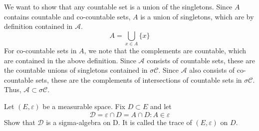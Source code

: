 \begin{solution}
	We want to show that any countable set is a union of the singletons. Since $A$ contains countable and co-countable sets, $A$ is a union of singletons, which are by definition contained in $\mathcal{A}$.
	\begin{equation}
		A = \bigcup_{x\in A}\{x\}
	\end{equation}
	For co-countable sets in $A$, we note that the complements are countable, which are contained in the above definition. Since $\mathcal{A}$ consists of countable sets, these are the countable unions of singletons contained in $\sigma \mathcal{C}$. Since $\mathcal{A}$ also consists of co-countable sets, these are the complements of intersections of countable sets in $\sigma \mathcal{C}$. Thus, $\mathcal{A} \subset \sigma \mathcal{C}$.
\end{solution}

\fullpageboxline
\begin{problem}
	Let $(E, \varepsilon)$ be a measurable space. Fix $D\subset E$ and let $$\mathcal{D} = \varepsilon \cap D = {A \cap D} : A \in \varepsilon$$ Show that $\mathcal{D}$ is a sigma-algebra on D. It is called the trace of $(E, \varepsilon)$ on $D$.
\end{problem}

